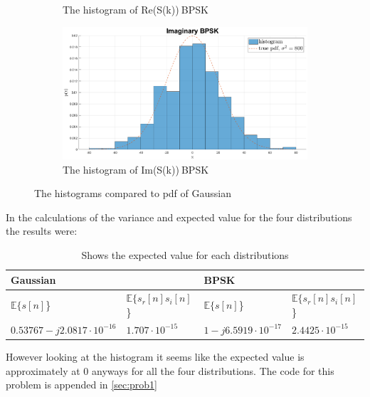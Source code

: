 \begin{figure}[ht]
\begin{subfigure}{.5\textwidth}
        \caption{The histogram of Re(S(k))$~$BPSK}
        \label{fig:re_bpsk}
    \end{subfigure}
    \begin{subfigure}{.5\textwidth}
        \centering
        \includegraphics[width=.8\linewidth]{figures/im_bpsk.eps}
        \caption{The histogram of Im(S(k))$~$BPSK}
        \label{fig:im_bpsk}
    \end{subfigure}
    \caption{The histograms compared to pdf of Gaussian}
    \label{fig:gauss}
\end{figure}
In the calculations of the variance and expected value for the four distributions the results were:
\begin{table}[ht]
\centering
\begin{tabular}{|l|l|l|l|}
\hline
\multicolumn{2}{|l|}{Gaussian} & \multicolumn{2}{|l|}{BPSK}\\ \hline
$\mathbb{E}\{s[n]$\} & $\mathbb{E}\{s_{r}[n]s_{i}[n]$\} & $\mathbb{E}\{s[n]$\} & $\mathbb{E}\{s_{r}[n]s_{i}[n]$\}\\
\hline
$0.53767-j2.0817\cdot10^{-16}$ & $1.707\cdot10^{-15}$ & $1-j6.5919\cdot10^{-17}$ & $2.4425\cdot10^{-15}$\\ 
\hline
\end{tabular}
\caption{Shows the expected value for each distributions}
\end{table}
\newline However looking at the histogram it seems like the expected value is approximately at $0$ anyways for all the four distributions. The code for this problem is appended in \ref{sec:prob1}

